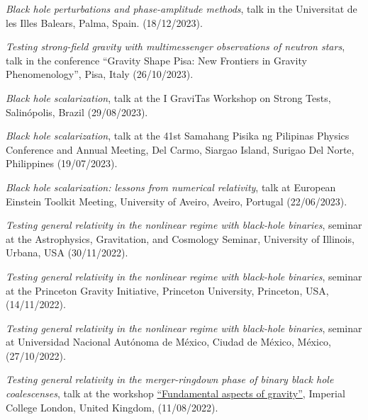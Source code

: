 \documentclass[10pt]{article}
\newcommand{\invited}{{\color{aeilbl}{invited}}}
\begin{document}
\begin{bibenum}
    \item \emph{Black hole perturbations and phase-amplitude methods},
    \invited{} talk in the Universitat de les Illes Balears, Palma, Spain.
    \hfill (18/12/2023).

    \item \emph{Testing strong-field gravity with multimessenger observations of neutron stars},
    \invited{} talk in the conference ``Gravity Shape Pisa: New Frontiers in Gravity Phenomenology'',
    Pisa, Italy
    \hfill (26/10/2023).

    \item \emph{Black hole scalarization},
    \invited{} talk at the I GraviTas Workshop on Strong Tests, Salin\'opolis, Brazil
    \hfill (29/08/2023).

    \item \emph{Black hole scalarization},
    \invited{} talk at the 41st Samahang Pisika ng Pilipinas Physics Conference and Annual Meeting, Del Carmo, Siargao Island, Surigao Del Norte, Philippines
    \hfill (19/07/2023).

    \item \emph{Black hole scalarization: lessons from numerical relativity},
    \invited{} talk at European Einstein Toolkit Meeting, University of Aveiro, Aveiro, Portugal
    \hfill (22/06/2023).

    \item \emph{Testing general relativity in the nonlinear regime with black-hole binaries},
    seminar at the Astrophysics, Gravitation, and Cosmology Seminar, University of Illinois, Urbana, USA
    \hfill (30/11/2022).

    \item
    \emph{Testing general relativity in the nonlinear regime with black-hole binaries},
    \invited{} seminar at the Princeton Gravity Initiative, Princeton University, Princeton, USA,
    (14/11/2022).

    \item
    \emph{Testing general relativity in the nonlinear regime with black-hole binaries},
    \invited{} seminar at Universidad Nacional Aut\'onoma de M\'exico, Ciudad de M\'exico, M\'exico,
    (27/10/2022).

    \item
    \emph{Testing general relativity in the merger-ringdown phase of binary black hole coalescenses},
    \invited{} talk at the workshop \href{https://sites.google.com/view/fundamental-aspects-of-gravity}{``Fundamental aspects of gravity''}, Imperial College London, United Kingdom,
    (11/08/2022).


\end{bibenum}
\end{document}
